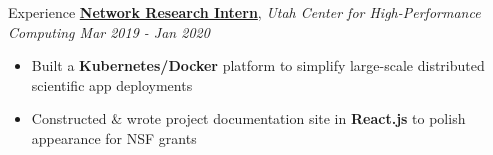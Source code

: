 \documentclass{resume/resume}
\begin{document}
\begin{rSection}{Experience}
    \href{https://slateci.io/}{\bf Network Research Intern}, {\em Utah Center for High-Performance Computing \hfill Mar 2019 - Jan 2020}
    \vspace{-6pt}
    \begin{itemize}[nosep]
        \item Built a {\bf Kubernetes/Docker} platform to simplify large-scale distributed scientific app deployments
        \item Constructed \& wrote project documentation site in {\bf React.js} to polish appearance for NSF grants
    \end{itemize}
    
    


\end{rSection}
\end{document}
